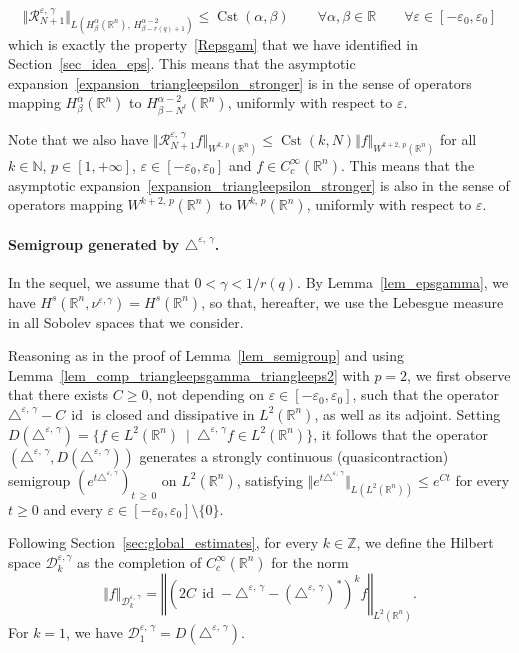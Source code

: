 \documentclass[10pt]{amsart}
\theoremstyle{definition}\newtheorem{defi}[theo]{Definition}\newtheorem{rema}[theo]{Remark}\newtheorem{exam}[theo]{Example}\newtheorem{exem}[theo]{Example}\newtheorem{nota}[theo]{Notation}
\newcommand*\R{\mathbb{R}}
\newcommand*\N{\mathbb{N}}
\newcommand*\Z{\mathbb{Z}}
\newcommand{\calR}{\mathcal{R}}
\newcommand{\calD}{\mathcal{D}}
\DeclareMathOperator{\Cst}{Cst}
\DeclareMathOperator{\id}{id}
\renewcommand{\geq}{\geqslant}
\renewcommand{\leq}{\leqslant}
\let\oldforall\forall
\renewcommand*{\forall}{\mathrel{\oldforall}}
\begin{document}
\[
\Vert \calR_{N+1}^{\varepsilon,\,\gamma}\Vert_{L\left(H^\alpha_\beta(\R^n),\,H^{\alpha-2}_{\beta-r(q)+1}\right)} \leq \Cst(\alpha,\beta) \qquad \forall\alpha,\beta\in\R \qquad \forall\varepsilon\in[-\varepsilon_0,\varepsilon_0]
\]
which is exactly the property~\eqref{Repsgam} that we have identified in Section~\ref{sec_idea_eps}. This means that the asymptotic expansion~\eqref{expansion_triangleepsilon_stronger} is in the sense of operators mapping $H^\alpha_\beta(\R^n)$ to $H^{\alpha-2}_{\beta-N^\ell}(\R^n)$, uniformly with respect to $\varepsilon$.

Note that we also have $\Vert \calR_{N+1}^{\varepsilon,\,\gamma} f \Vert_{W^{k,\,p}(\R^n)} \leq \Cst(k,N) \Vert f\Vert_{W^{k+2,\,p}(\R^n)}$ for all $k\in\N$, $p\in[1,+\infty]$, $\varepsilon\in[-\varepsilon_0,\varepsilon_0]$ and $f\in C_c^\infty(\R^n)$. This means that the asymptotic expansion~\eqref{expansion_triangleepsilon_stronger} is also in the sense of operators mapping $W^{k+2,\,p}(\R^n)$ to $W^{k,\,p}(\R^n)$, uniformly with respect to $\varepsilon$.



\paragraph{Semigroup generated by $\triangle^{\varepsilon,\,\gamma}$.}
In the sequel, we assume that $0<\gamma<1/r(q)$. By Lemma~\ref{lem_epsgamma}, we have $H^s(\R^n,\nu^{\varepsilon,\gamma})=H^s(\R^n)$, so that, hereafter, we use the Lebesgue measure in all Sobolev spaces that we consider.

Reasoning as in the proof of Lemma~\ref{lem_semigroup} and using Lemma~\ref{lem_comp_triangleepsgamma_triangleeps2} with $p=2$, we first observe that there exists $C\geq 0$, not depending on $\varepsilon\in[-\varepsilon_0,\varepsilon_0]$, such that the operator $\triangle^{\varepsilon,\,\gamma}-C\,\id$ is closed and dissipative in $L^2(\R^n)$, as well as its adjoint. Setting $D(\triangle^{\varepsilon,\,\gamma}) = \{ f\in L^2(\R^n) \ \mid\ \triangle^{\varepsilon,\,\gamma} f \in L^2(\R^n) \}$, it follows that the operator $(\triangle^{\varepsilon,\,\gamma},D(\triangle^{\varepsilon,\,\gamma}))$ generates a strongly continuous (quasicontraction) semigroup $(e^{t\triangle^{\varepsilon,\,\gamma}})_{t\,\geq\,0}$ on $L^2(\R^n)$, satisfying $\Vert e^{t\triangle^{\varepsilon,\,\gamma}}\Vert_{L(L^2(\R^n))} \leq e^{Ct}$ for every $t\geq 0$ and every $\varepsilon\in[-\varepsilon_0,\varepsilon_0]\setminus\{0\}$.

Following Section~\ref{sec:global_estimates}, for every $k\in\Z$, we define the Hilbert space $\calD^{\varepsilon,\gamma}_k$ as the completion of $C_c^\infty(\R^n)$ for the norm
\[
\Vert f\Vert_{\calD^{\varepsilon,\,\gamma}_k} = \left\Vert \left(2C\,\id-\triangle^{\varepsilon,\,\gamma}-(\triangle^{\varepsilon,\,\gamma})^*\right)^k f\right\Vert_{L^2(\R^n)}.
\]
For $k=1$, we have $\calD^{\varepsilon,\,\gamma}_1 = D(\triangle^{\varepsilon,\,\gamma})$.
\end{document}
